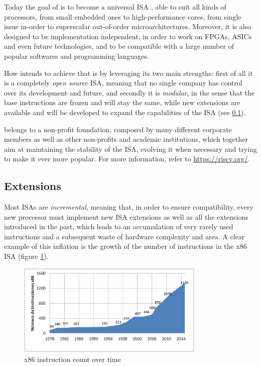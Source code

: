 Today the goal of \riscv is to become a universal ISA \cite{reader}, able to suit all kinds of processors, from small embedded ones to high-performance cores, from single issue in-order to superscalar out-of-order microarchitectures. Moreover, it is also designed to be implementation independent, in order to work on FPGAs, ASICs and even future technologies, and to be compatible with a large number of popular softwares and programming languages.

How \riscv intends to achieve that is by leveraging its two main strengths: first of all it is a completely \emph{open source} ISA, meaning that no single company has control over its development and future, and secondly it is \emph{modular}, in the sense that the base instructions are frozen and will stay the same, while new extensions are available and will be developed to expand the capabilities of the ISA (see \ref{sec:extensions}).

\riscv belongs to a non-profit foundation, composed by many different corporate members as well as other non-profits and academic institutions, which together aim at maintaining the stability of the ISA, evolving it when necessary and trying to make it ever more popular. For more information, refer to \url{https://riscv.org/}.

\subsection{Extensions}\label{sec:extensions}
Most ISAs are \emph{incremental}, meaning that, in order to ensure compatibility, every new processor must implement new ISA extensions as well as all the extensions introduced in the past, which leads to an accumulation of very rarely used instructions and a subsequent waste of hardware complexity and area. A clear example of this inflation is the growth of the number of instructions in the x86 ISA (figure \ref{fig:x86}).

\begin{figure}[hbtp]
  \centering
  \includegraphics[width=0.8\textwidth]{img/x86.png}
  \caption{x86 instruction count over time \cite[p.~3]{reader}}
  \label{fig:x86}
\end{figure}

